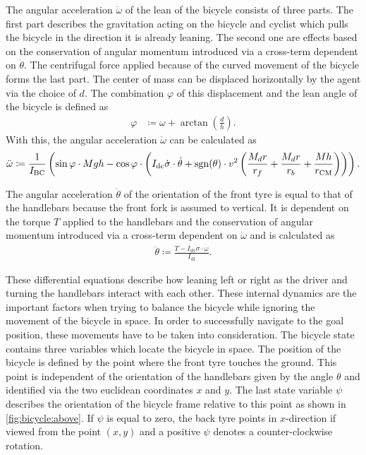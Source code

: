 The angular acceleration $\ddot{\omega}$ of the lean of the bicycle consists of three parts.
The first part describes the gravitation acting on the bicycle and cyclist which pulls the bicycle in the direction it is already leaning.
The second one are effects based on the conservation of angular momentum introduced via a cross-term dependent on  $\dot{\theta}$.
The centrifugal force applied because of the curved movement of the bicycle forms the last part.
The center of mass can be displaced horizontally by the agent via the choice of $d$.
The combination $\varphi$ of this displacement and the lean angle of the bicycle is defined as
\begin{align}
    \varphi &\coloneqq \omega + \arctan \left( \frac{d}{h} \right).
\end{align}
With this, the angular acceleration $\ddot{\omega}$ can be calculated as
\begin{align}
    \ddot{\omega} \coloneqq \frac{1}{I_{\text{BC}}} \left(
        \sin \varphi \cdot Mgh - \cos \varphi \cdot \left(
            I_{\text{dc}}\dot{\sigma}\cdot\dot{\theta} +
            \operatorname{sgn}(\theta) \cdot v^2 \left(
                \frac{M_dr}{r_f} + \frac{M_d r}{r_b} + \frac{Mh}{r_{\text{CM}}}
            \right)
        \right)
    \right).
\end{align}

The angular acceleration $\ddot{\theta}$ of the orientation of the front tyre is equal to that of the handlebars because the front fork is assumed to vertical.
It is dependent on the torque $T$ applied to the handlebars and the conservation of angular momentum introduced via a cross-term dependent on $\dot{\omega}$ and is calculated as
\begin{align}
    \ddot{\theta} \coloneqq \frac{T - I_{\text{dv}}\dot{\sigma}\cdot\dot{\omega}}{I_{\text{dl}}}.
\end{align}

These differential equations describe how leaning left or right as the driver and turning the handlebars interact with each other.
These internal dynamics are the important factors when trying to balance the bicycle while ignoring the movement of the bicycle in space.
In order to successfully navigate to the goal position, these movements have to be taken into consideration.
The bicycle state contains three variables which locate the bicycle in space.
The position of the bicycle is defined by the point where the front tyre touches the ground.
This point is independent of the orientation of the handlebars given by the angle $\theta$ and identified via the two euclidean coordinates $x$ and $y$.
The last state variable $\psi$ describes the orientation of the bicycle frame relative to this point as shown in \cref{fig:bicycle:above}.
If $\psi$ is equal to zero, the back tyre points in $x$-direction if viewed from the point $(x, y)$ and a positive $\psi$ denotes a counter-clockwise rotation.

